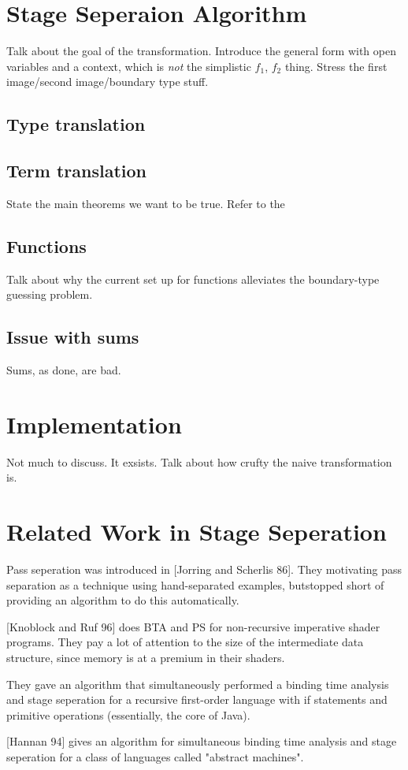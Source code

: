 \documentclass{article}
\begin{document}
\section{Stage Seperaion Algorithm}

Talk about the goal of the transformation.  Introduce the general form with open variables and a context, which is {\em not} the simplistic $f_1$, $f_2$ thing.  Stress the first image/second image/boundary type stuff.

\subsection {Type translation}

\subsection{Term translation}

State the main theorems we want to be true.  Refer to the 

\subsection{Functions}

Talk about why the current set up for functions alleviates the boundary-type guessing problem.

\subsection{Issue with sums}

Sums, as done, are bad.

\section {Implementation}

Not much to discuss.  It exsists.  Talk about how crufty the naive transformation is.

\section{Related Work in Stage Seperation}
Pass seperation was introduced in [Jorring and Scherlis 86].  They motivating pass separation as a technique using hand-separated examples, butstopped short of providing an algorithm to do this automatically.

[Knoblock and Ruf 96] does BTA and PS for non-recursive imperative shader programs.  They pay a lot of attention to the size of the intermediate data structure, since memory is at a premium in their shaders.

They gave an algorithm that simultaneously performed a binding time analysis and stage seperation for a recursive first-order language with if statements and primitive operations (essentially, the core of Java).

[Hannan 94] gives an algorithm for simultaneous binding time analysis and stage seperation for a class of languages called "abstract machines".
\end{document}
